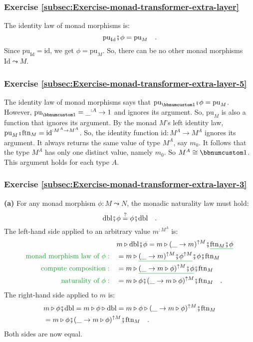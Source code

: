 \subsubsection*{Exercise \ref{subsec:Exercise-monad-transformer-extra-layer}}

The identity law of monad morphisms is:
\[
\text{pu}_{\text{Id}}\bef\phi=\text{pu}_{M}\quad.
\]
Since $\text{pu}_{\text{Id}}=\text{id}$, we get $\phi=\text{pu}_{M}$.
So, there can be no other monad morphisms $\text{Id}\leadsto M$.

\subsubsection*{Exercise \ref{subsec:Exercise-monad-transformer-extra-layer-5}}

The identity law of monad morphisms says that $\text{pu}_{\bbnum 1}\bef\phi=\text{pu}_{M}$.
However, $\text{pu}_{\bbnum 1}=\_^{:A}\rightarrow1$ and ignores its
argument. So, $\text{pu}_{M}$ is also a function that ignores its
argument. By the monad $M$\textsf{'}s left identity law, $\text{pu}_{M}\bef\text{ftn}_{M}=\text{id}^{:M^{A}\rightarrow M^{A}}$.
So, the identity function $\text{id}:M^{A}\rightarrow M^{A}$ ignores
its argument. It always returns the same value of type $M^{A}$, say
$m_{0}$. It follows that the type $M^{A}$ has only one distinct
value, namely $m_{0}$. So $M^{A}\cong\bbnum 1$. This argument holds
for each type $A$. 

\subsubsection*{Exercise \ref{subsec:Exercise-monad-transformer-extra-layer-3}}

\textbf{(a)} For any monad morphism $\phi:M\leadsto N$, the monadic
naturality law must hold:
\[
\text{dbl}\bef\phi\overset{?}{=}\phi\bef\text{dbl}\quad.
\]
The left-hand side applied to an arbitrary value $m^{:M^{A}}$ is:
\begin{align*}
 & m\triangleright\text{dbl}\bef\phi=m\triangleright(\_\rightarrow m)^{\uparrow M}\bef\gunderline{\text{ftn}_{M}\bef\phi}\\
{\color{greenunder}\text{monad morphism law of }\phi:}\quad & =m\triangleright\gunderline{(\_\rightarrow m)^{\uparrow M}\bef\phi^{\uparrow M}}\bef\phi\bef\text{ftn}_{M}\\
{\color{greenunder}\text{compute composition}:}\quad & =m\triangleright\gunderline{(\_\rightarrow m\triangleright\phi)^{\uparrow M}\bef\phi}\bef\text{ftn}_{M}\\
{\color{greenunder}\text{naturality of }\phi:}\quad & =m\triangleright\phi\bef(\_\rightarrow m\triangleright\phi)^{\uparrow M}\bef\text{ftn}_{M}\quad.
\end{align*}
The right-hand side applied to $m$ is:
\begin{align*}
 & m\triangleright\phi\bef\text{dbl}=m\triangleright\phi\triangleright\text{dbl}=m\triangleright\phi\triangleright(\_\rightarrow m\triangleright\phi)^{\uparrow M}\bef\text{ftn}_{M}\\
 & =m\triangleright\phi\bef(\_\rightarrow m\triangleright\phi)^{\uparrow M}\bef\text{ftn}_{M}\quad.
\end{align*}
Both sides are now equal.

